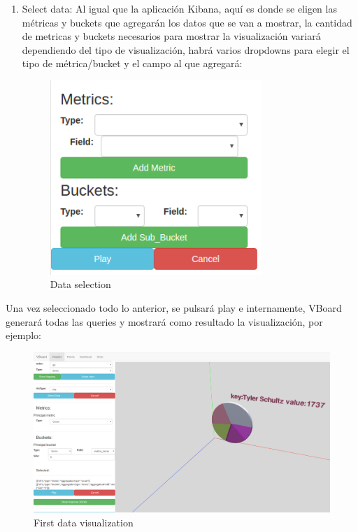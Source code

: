 \documentclass[a4paper, 12pt]{book}
\begin{document}
\begin{enumerate}
\begin{figure}[H]
        \end{figure}
    \item Select data: Al igual que la aplicación Kibana, aquí es donde se eligen las métricas y buckets que agregarán los datos que se van a mostrar, la cantidad de metricas y buckets necesarios para mostrar la visualización variará dependiendo del tipo de visualización, habrá varios dropdowns para elegir el tipo de métrica/bucket y el campo al que agregará:
    \begin{figure}[H]
      \centering
      \includegraphics[width=8cm, keepaspectratio]{img/development/aggregationstype}
      \caption{Data selection}
      \label{fig:aggregationstype}
    \end{figure}
\end{enumerate}

Una vez seleccionado todo lo anterior, se pulsará play e internamente, VBoard generará todas las queries y mostrará como resultado la visualización, por ejemplo:

\begin{figure}[H]
  \centering
  \includegraphics[width=16cm, keepaspectratio]{img/development/firstdatavisualization}
  \caption{First data visualization}
  \label{fig:firsdatavisualization}
\end{figure}
\end{document}
